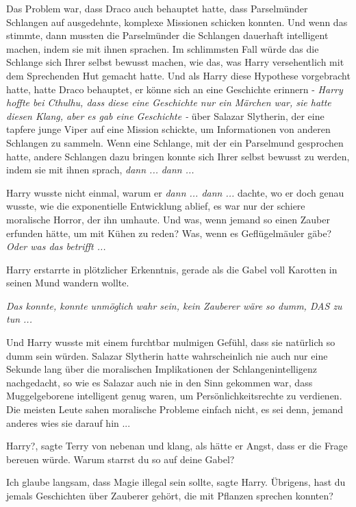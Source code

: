 Das Problem war, dass Draco auch behauptet hatte, dass Parselmünder Schlangen
auf ausgedehnte, komplexe Missionen schicken konnten. Und wenn das stimmte, dann
mussten die Parselmünder die Schlangen dauerhaft intelligent machen, indem sie
mit ihnen sprachen. Im schlimmsten Fall würde das die Schlange sich Ihrer selbst
bewusst machen, wie das, was Harry versehentlich mit dem Sprechenden Hut gemacht
hatte. Und als Harry diese Hypothese vorgebracht hatte, hatte Draco behauptet,
er könne sich an eine Geschichte erinnern - \emph{Harry hoffte bei Cthulhu, dass
diese eine Geschichte nur ein Märchen war, sie hatte diesen Klang, aber es gab
eine Geschichte -} über Salazar Slytherin, der eine tapfere junge Viper auf eine
Mission schickte, um Informationen von anderen Schlangen zu sammeln. Wenn eine
Schlange, mit der ein Parselmund gesprochen hatte, andere Schlangen dazu bringen
konnte sich Ihrer selbst bewusst zu werden, indem sie mit ihnen sprach,
\emph{dann ...} \emph{dann ...}

Harry wusste nicht einmal, warum er \glqq{}\emph{dann ... dann ...}\grqq{} dachte,
wo er doch genau wusste, wie die exponentielle Entwicklung ablief, es war nur
der schiere moralische Horror, der ihn umhaute. Und was, wenn jemand so einen
Zauber erfunden hätte, um mit Kühen zu reden? Was, wenn es Geflügelmäuler gäbe?
\emph{Oder was das betrifft ...}

Harry erstarrte in plötzlicher Erkenntnis, gerade als die Gabel voll Karotten in
seinen Mund wandern wollte.

\emph{Das konnte, konnte unmöglich wahr sein, kein Zauberer wäre so dumm, DAS
zu tun ...}

Und Harry wusste mit einem furchtbar mulmigen Gefühl, dass sie natürlich so dumm
sein würden. Salazar Slytherin hatte wahrscheinlich nie auch nur eine Sekunde
lang über die moralischen Implikationen der Schlangenintelligenz nachgedacht, so
wie es Salazar auch nie in den Sinn gekommen war, dass Muggelgeborene
intelligent genug waren, um Persönlichkeitsrechte zu verdienen. Die meisten
Leute sahen moralische Probleme einfach nicht, es sei denn, jemand anderes wies
sie darauf hin ...

\glqq{}Harry?\grqq{}, sagte Terry von nebenan und klang, als hätte er Angst, dass
er die Frage bereuen würde. \glqq{}Warum starrst du so auf deine Gabel?\grqq{}

\glqq{}Ich glaube langsam, dass Magie illegal sein sollte\grqq{}, sagte Harry.
\glqq{}Übrigens, hast du jemals Geschichten über Zauberer gehört, die mit
Pflanzen sprechen konnten?\grqq{}

